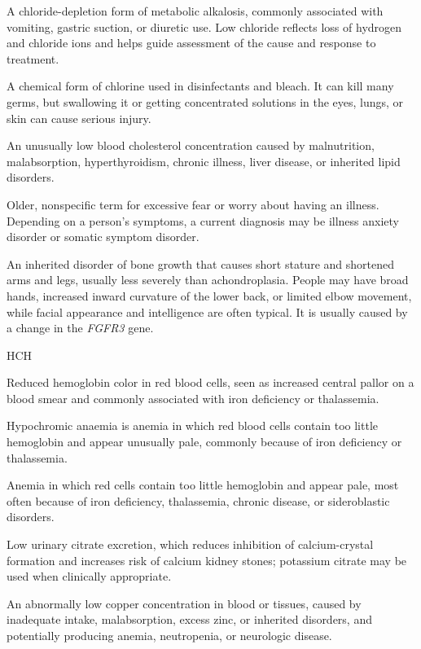  A chloride-depletion form of metabolic alkalosis, commonly associated with vomiting, gastric suction, or diuretic use. Low chloride reflects loss of hydrogen and chloride ions and helps guide assessment of the cause and response to treatment.

 A chemical form of chlorine used in disinfectants and bleach. It can kill many germs, but swallowing it or getting concentrated solutions in the eyes, lungs, or skin can cause serious injury.

 An unusually low blood cholesterol concentration caused by malnutrition, malabsorption, hyperthyroidism, chronic illness, liver disease, or inherited lipid disorders.

 Older, nonspecific term for excessive fear or worry about having an illness. Depending on a person's symptoms, a current diagnosis may be illness anxiety disorder or somatic symptom disorder.

 An inherited disorder of bone growth that causes short stature and shortened arms and legs, usually less severely than achondroplasia. People may have broad hands, increased inward curvature of the lower back, or limited elbow movement, while facial appearance and intelligence are often typical. It is usually caused by a change in the \textit{FGFR3} gene.

\synonyms
HCH

 Reduced hemoglobin color in red blood cells, seen as increased central pallor on a blood smear and commonly associated with iron deficiency or thalassemia.

 Hypochromic anaemia is anemia in which red blood cells contain too little hemoglobin and appear unusually pale, commonly because of iron deficiency or thalassemia.

 Anemia in which red cells contain too little hemoglobin and appear pale, most often because of iron deficiency, thalassemia, chronic disease, or sideroblastic disorders.

 Low urinary citrate excretion, which reduces inhibition of calcium-crystal formation and increases risk of calcium kidney stones; potassium citrate may be used when clinically appropriate.

 An abnormally low copper concentration in blood or tissues, caused by inadequate intake, malabsorption, excess zinc, or inherited disorders, and potentially producing anemia, neutropenia, or neurologic disease.

